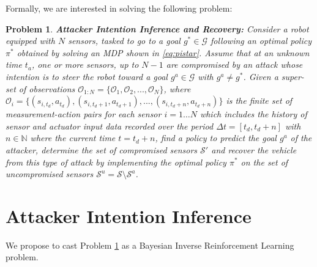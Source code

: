 \documentclass[letterpaper, 10 pt, conference]{ieeeconf}  %
\newcommand{\Ne}{\mathbb {N}}
\newtheorem{problem}{Problem}
\newcommand\NB[1]{$\spadesuit$\footnote{NB: #1}}
\begin{document}
Formally, we are interested in solving the following problem:
\begin{problem}\label{prob:p1}
{ \bf Attacker Intention Inference and Recovery:} Consider a robot equipped with $N$ sensors, tasked to go to a goal $g^* \in \mathcal G$ following an optimal policy $\pi^*$ obtained by solving an MDP shown in \eqref{eq:pistar}. Assume that at an unknown time $t_a$, one or more sensors, up to $N-1$ are compromised by an attack whose intention is to steer the robot toward a goal $g^a \in \mathcal G$ with $g^a \neq g^*$. Given a super-set of observations $\mathcal{O}_{1:N} = \{\mathcal{O}_{1}, \mathcal{O}_{2}, ..., \mathcal{O}_{N}\}$, where $\mathcal{O}_{i} = \{(s_{i,t_d}, a_{t_d}), (s_{i,t_d+1}, a_{t_d+1}), ..., (s_{i,t_d+n}, a_{t_d+n})\}$ is the finite set of measurement-action pairs for each sensor $i=1 \ldots N$ which includes the history of sensor and actuator input data recorded over the period $\Delta t = [t_d, t_d+n ]$ with $n \in \Ne$ where the current time $t=t_d+n$, find a policy to predict the goal $g^a$ of the attacker, determine the set of compromised sensors $\mathcal{S}'$ and recover the vehicle from this type of attack by implementing the optimal policy $\pi^*$ on the set of uncompromised sensors $\mathcal S^u = \mathcal S \setminus \mathcal{S}^a$.

\end{problem}

\section{Attacker Intention Inference}\label{sec:approach}
We propose to cast Problem \ref{prob:p1} as a Bayesian Inverse Reinforcement Learning problem. 
\end{document}
